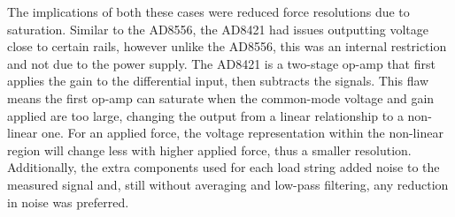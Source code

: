 The implications of both these cases were reduced force resolutions due to saturation. Similar to the AD8556, the AD8421 had issues outputting voltage close to certain rails, however unlike the AD8556, this was an internal restriction and not due to the power supply. The AD8421 is a two-stage op-amp that first applies the gain to the differential input, then subtracts the signals. This flaw means the first op-amp can saturate when the common-mode voltage and gain applied are too large, changing the output from a linear relationship to a non-linear one. For an applied force, the voltage representation within the non-linear region will change less with higher applied force, thus a smaller resolution. Additionally, the extra components used for each load string added noise to the measured signal and, still without averaging and low-pass filtering, any reduction in noise was preferred.

